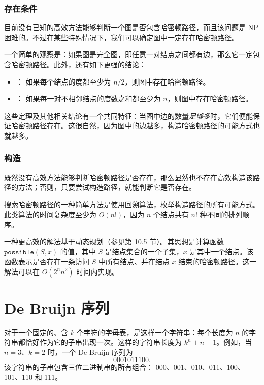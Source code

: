 \subsubsection{存在条件}

目前没有已知的高效方法能够判断一个图是否包含哈密顿路径，而且该问题是 NP 困难的。不过在某些特殊情况下，我们可以确定图中一定存在哈密顿路径。

一个简单的观察是：如果图是完全图，即任意一对结点之间都有边，那么它一定包含哈密顿路径。此外，还有如下更强的结论：

\begin{itemize}
\item
{}
：%
如果每个结点的度都至少为 $n/2$，则图中存在哈密顿路径。
\item
{}
：%
如果每一对不相邻结点的度数之和都至少为 $n$，则图中存在哈密顿路径。
\end{itemize}

这些定理及其他相关结论有一个共同特征：当图中边的数量\emph{足够多}时，它们便能保证哈密顿路径存在。这很自然，因为图中的边越多，构造哈密顿路径的可能方式也就越多。

\subsubsection{构造}

既然没有高效方法能够判断哈密顿路径是否存在，那么显然也不存在高效构造该路径的方法；否则，只要尝试构造路径，就能判断它是否存在。

搜索哈密顿路径的一种简单方法是使用回溯算法，枚举构造路径的所有可能方式。此类算法的时间复杂度至少为 $O(n!)$，因为 $n$ 个结点共有 $n!$ 种不同的排列顺序。

一种更高效的解法基于动态规划（参见第 10.5 节）。其思想是计算函数 $\texttt{possible}(S,x)$ 的值，其中 $S$ 是结点集合的一个子集，$x$ 是其中一个结点。该函数表示是否存在一条访问 $S$ 中所有结点、并在结点 $x$ 结束的哈密顿路径。这一解法可以在 $O(2^n n^2)$ 时间内实现。

\section{De Bruijn 序列}


对于一个固定的、含 $k$ 个字符的字母表，是这样一个字符串：每个长度为 $n$ 的字符串都恰好作为它的子串出现一次。这样的字符串长度为 $k^n+n-1$。例如，当 $n=3$、$k=2$ 时，一个 De Bruijn 序列为
\[0001011100.\]
该字符串的子串包含三位二进制串的所有组合：
000、001、010、011、100、101、110 和 111。

